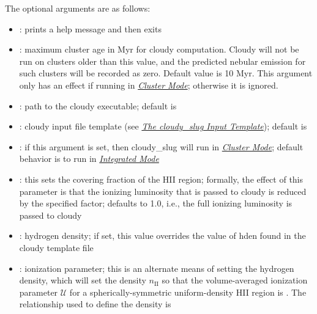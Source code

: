 \documentclass[letterpaper,10pt,english]{sphinxmanual}
\begin{document}
The optional arguments are as follows:
\begin{itemize}
\item {} 
: prints a help message and then exits

\item {} 
: maximum cluster age in Myr for
cloudy computation. Cloudy will not be run on clusters older than
this value, and the predicted nebular emission for such clusters
will be recorded as zero. Default value is 10 Myr. This argument only
has an effect if running in {\hyperref[cloudy:sssec-cloudy-cluster-mode]{\emph{Cluster Mode}}};
otherwise it is ignored.

\item {} 
: path to the cloudy executable; default
is 

\item {} 
: cloudy input file template (see
{\hyperref[cloudy:ssec-cloudy-template]{\emph{The cloudy\_slug Input Template}}}); default is

\item {} 
: if this argument is set, then cloudy\_slug
will run in {\hyperref[cloudy:sssec-cloudy-cluster-mode]{\emph{Cluster Mode}}}; default behavior is to
run in {\hyperref[cloudy:sssec-cloudy-integrated-mode]{\emph{Integrated Mode}}}

\item {} 
: this sets the
covering fraction of the HII region; formally, the effect of this
parameter is that the ionizing luminosity that is passed to cloudy
is reduced by the specified factor; defaults to 1.0, i.e., the full
ionizing luminosity is passed to cloudy

\item {} 
: hydrogen density; if set, this value
overrides the value of hden found in the cloudy template file

\item {} 
: ionization parameter; this is
an alternate means of setting the hydrogen density, which will set
the density \(n_{\mathrm{II}}\) so that the volume-averaged
ionization parameter \(\mathcal{U}\) for a spherically-symmetric
uniform-density HII region is . The relationship used to
define the density is

\end{itemize}
\end{document}
